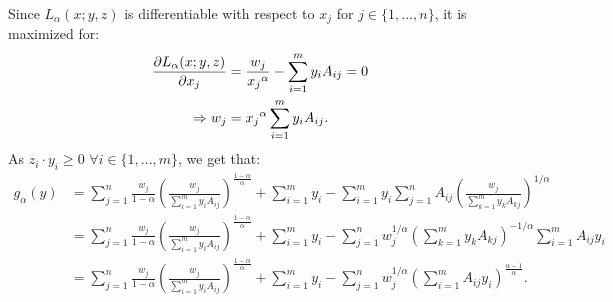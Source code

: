 \documentclass[11pt]{article}
\begin{document}
Since $L_{\alpha}(x; y, z)$ is differentiable with respect to $x_j$ for $j\in \{1,...,n\}$, it is maximized for:
\begin{align}
\frac{\partial L_{\alpha}(x; y, z)}{\partial x_j} &= \frac{w_j}{{x_j}^{\alpha}} - \sum_{i=1}^m y_i A_{ij} = 0\notag\\
\Rightarrow w_j &= {x_j}^{\alpha}\sum_{i=1}^m y_i A_{ij}. \label{eq:kkt-condition-alpha}
\end{align}
As $z_i\cdot y_i \geq 0$ $\forall i\in \{1,...,m\}$, we get that:
\begin{align*}
g_{\alpha}(y) &= \sum_{j=1}^n \frac{w_j}{1-\alpha}\left(\frac{w_j}{\sum_{i=1}^m y_i A_{ij}}\right)^{\frac{1-\alpha}{\alpha}}+\sum_{i=1}^m y_i - \sum_{i=1}^m y_i \sum_{j=1}^n A_{ij} \left(\frac{w_j}{\sum_{k=1}^{m}y_k A_{kj}}\right)^{1/\alpha}\\
&= \sum_{j=1}^n \frac{w_j}{1-\alpha}\left(\frac{w_j}{\sum_{i=1}^m y_i A_{ij}}\right)^{\frac{1-\alpha}{\alpha}}+\sum_{i=1}^m y_i - \sum_{j=1}^n w_j^{1/\alpha} \left(\sum_{k=1}^{m}y_k A_{kj}\right)^{-1/\alpha}\sum_{i=1}^m A_{ij}y_i\\
&= \sum_{j=1}^n \frac{w_j}{1-\alpha}\left(\frac{w_j}{\sum_{i=1}^m y_i A_{ij}}\right)^{\frac{1-\alpha}{\alpha}}+\sum_{i=1}^m y_i - \sum_{j=1}^n w_j^{1/\alpha}\left(\sum_{i=1}^m A_{ij}y_i\right)^{\frac{\alpha-1}{\alpha}}.
\end{align*}
\end{document}
